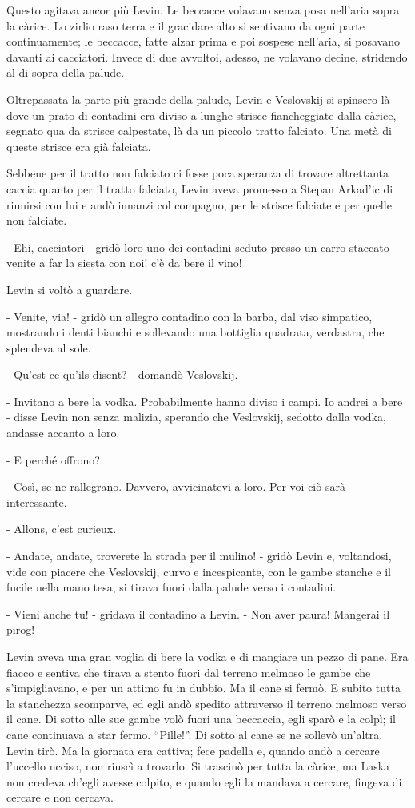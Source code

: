 Questo agitava ancor più Levin. Le beccacce volavano senza posa nell'aria sopra la càrice. Lo zirlio raso terra e il gracidare alto si sentivano da ogni parte continuamente; le beccacce, fatte alzar prima e poi sospese nell'aria, si posavano davanti ai cacciatori. Invece di due avvoltoi, adesso, ne volavano decine, stridendo al di sopra della palude. 

Oltrepassata la parte più grande della palude, Levin e Veslovskij si spinsero là dove un prato di contadini era diviso a lunghe strisce fiancheggiate dalla càrice, segnato qua da strisce calpestate, là da un piccolo tratto falciato. Una metà di queste strisce era già falciata. 

Sebbene per il tratto non falciato ci fosse poca speranza di trovare altrettanta caccia quanto per il tratto falciato, Levin aveva promesso a Stepan Arkad'ic di riunirsi con lui e andò innanzi col compagno, per le strisce falciate e per quelle non falciate. 

- Ehi, cacciatori - gridò loro uno dei contadini seduto presso un carro staccato - venite a far la siesta con noi! c'è da bere il vino! 

Levin si voltò a guardare. 

- Venite, via! - gridò un allegro contadino con la barba, dal viso simpatico, mostrando i denti bianchi e sollevando una bottiglia quadrata, verdastra, che splendeva al sole. 

- Qu'est ce qu'ils disent? - domandò Veslovskij. 

- Invitano a bere la vodka. Probabilmente hanno diviso i campi. Io andrei a bere - disse Levin non senza malizia, sperando che Veslovskij, sedotto dalla vodka, andasse accanto a loro. 

- E perché offrono? 

- Così, se ne rallegrano. Davvero, avvicinatevi a loro. Per voi ciò sarà interessante. 

- Allons, c'est curieux. 

- Andate, andate, troverete la strada per il mulino! - gridò Levin e, voltandosi, vide con piacere che Veslovskij, curvo e incespicante, con le gambe stanche e il fucile nella mano tesa, si tirava fuori dalla palude verso i contadini. 

- Vieni anche tu! - gridava il contadino a Levin. - Non aver paura! Mangerai il pirog! 

Levin aveva una gran voglia di bere la vodka e di mangiare un pezzo di pane. Era fiacco e sentiva che tirava a stento fuori dal terreno melmoso le gambe che s'impigliavano, e per un attimo fu in dubbio. Ma il cane si fermò. E subito tutta la stanchezza scomparve, ed egli andò spedito attraverso il terreno melmoso verso il cane. Di sotto alle sue gambe volò fuori una beccaccia, egli sparò e la colpì; il cane continuava a star fermo. ``Pille!''. Di sotto al cane se ne sollevò un'altra. Levin tirò. Ma la giornata era cattiva; fece padella e, quando andò a cercare l'uccello ucciso, non riuscì a trovarlo. Si trascinò per tutta la càrice, ma Laska non credeva ch'egli avesse colpito, e quando egli la mandava a cercare, fingeva di cercare e non cercava. 

